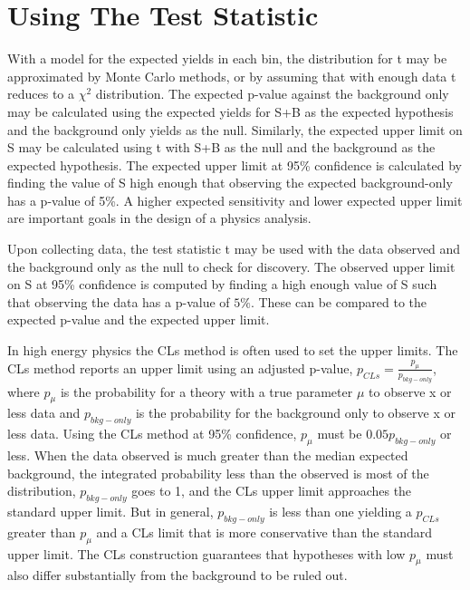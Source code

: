 \section{Using The Test Statistic}

With a model for the expected yields in each bin, the distribution for t may be approximated by Monte Carlo methods, or by assuming that with enough data t reduces to a $\chi^2$ distribution. The expected p-value against the background only may be calculated using the expected yields for S+B as the expected hypothesis and the background only yields as the null. Similarly, the expected upper limit on S may be calculated using t with S+B as the null and the background as the expected hypothesis. The expected upper limit at 95\% confidence is calculated by finding the value of S high enough that observing the expected background-only has a p-value of 5\%. A higher expected sensitivity and lower expected upper limit are important goals in the design of a physics analysis.

Upon collecting data, the test statistic t may be used with the data observed and the background only as the null to check for discovery. The observed upper limit on S at 95\% confidence is computed by finding a high enough value of S such that observing the data has a p-value of $5\%$. These can be compared to the expected p-value and the expected upper limit. 
 
In high energy physics the CLs method is often used to set the upper limits. The CLs method reports an upper limit using an adjusted p-value, $p_{CLs} = \frac{p_\mu}{p_{bkg-only}}$, where $p_{\mu}$ is the probability for a theory with a true parameter $\mu$ to observe x or less data and $p_{bkg-only}$ is the probability for the background only to observe x or less data. Using the CLs method at 95\% confidence, $p_\mu$ must be $0.05p_{bkg-only}$ or less. When the data observed is much greater than the median expected background, the integrated probability less than the observed is most of the distribution, $p_{bkg-only}$ goes to 1, and the CLs upper limit approaches the standard upper limit. But in general, $p_{bkg-only}$ is less than one yielding a $p_{CLs}$ greater than $p_\mu$ and a CLs limit that is more conservative than the standard upper limit. The CLs construction guarantees that hypotheses with low $p_{\mu}$ must also differ substantially from the background to be ruled out.   



